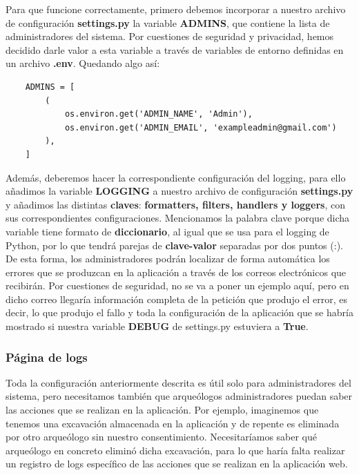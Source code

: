 Para que funcione correctamente, primero debemos incorporar a nuestro archivo de
configuración \textbf{settings.py} la variable \textbf{ADMINS}, que contiene la lista de
administradores del sistema. Por cuestiones de seguridad y privacidad, hemos decidido
darle valor a esta variable a través de variables de entorno definidas en un archivo
\textbf{.env}. Quedando algo así:

    \begin{verbatim}
    ADMINS = [
        (
            os.environ.get('ADMIN_NAME', 'Admin'),
            os.environ.get('ADMIN_EMAIL', 'exampleadmin@gmail.com')
        ),
    ]
    \end{verbatim}

Además, deberemos hacer la correspondiente configuración del logging, para ello añadimos
la variable \textbf{LOGGING} a nuestro archivo de configuración \textbf{settings.py} y
añadimos las distintas \textbf{claves}: \textbf{formatters, filters, handlers y loggers},
con sus correspondientes configuraciones. Mencionamos la palabra clave porque dicha
variable tiene formato de \textbf{diccionario}, al igual que se usa para el logging de
Python, por lo que tendrá parejas de \textbf{clave-valor} separadas por dos puntos (:). \\

De esta forma, los administradores podrán localizar de forma automática los errores
que se produzcan en la aplicación a través de los correos electrónicos que recibirán. Por
cuestiones de seguridad, no se va a poner un ejemplo aquí, pero en dicho correo llegaría
información completa de la petición que produjo el error, es decir, lo que produjo el
fallo y toda la configuración de la aplicación que se habría mostrado si nuestra variable
\textbf{DEBUG} de settings.py estuviera a \textbf{True}.


\subsubsection{Página de logs}
Toda la configuración anteriormente descrita es útil solo para administradores del sistema,
pero necesitamos también que arqueólogos administradores puedan saber las acciones que se
realizan en la aplicación. Por ejemplo, imaginemos que tenemos una excavación almacenada en
la aplicación y de repente es eliminada por otro arqueólogo sin nuestro consentimiento.
Necesitaríamos saber qué arqueólogo en concreto eliminó dicha excavación, para lo que haría
falta realizar un registro de logs específico de las acciones que se realizan en la
aplicación web. \\

